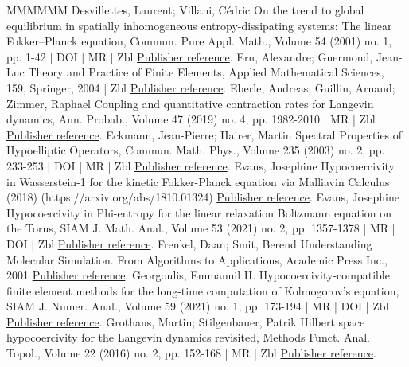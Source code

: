 \begin{thebibliography}{MMMMMM}
 Desvillettes, Laurent; Villani, Cédric On the trend to global equilibrium in spatially inhomogeneous entropy-dissipating systems: The linear Fokker–Planck equation, Commun. Pure Appl. Math., Volume 54 (2001) no. 1, pp. 1-42 | DOI | MR | Zbl \href{https://ahl.centre-mersenne.org/item/AHL_2022__5__523_0/#DV01}{Publisher reference}.
 Ern, Alexandre; Guermond, Jean-Luc Theory and Practice of Finite Elements, Applied Mathematical Sciences, 159, Springer, 2004 | Zbl \href{https://ahl.centre-mersenne.org/item/AHL_2022__5__523_0/#ern2013theory}{Publisher reference}.
 Eberle, Andreas; Guillin, Arnaud; Zimmer, Raphael Coupling and quantitative contraction rates for Langevin dynamics, Ann. Probab., Volume 47 (2019) no. 4, pp. 1982-2010 | MR | Zbl \href{https://ahl.centre-mersenne.org/item/AHL_2022__5__523_0/#EGZ19}{Publisher reference}.
 Eckmann, Jean-Pierre; Hairer, Martin Spectral Properties of Hypoelliptic Operators, Commun. Math. Phys., Volume 235 (2003) no. 2, pp. 233-253 | DOI | MR | Zbl \href{https://ahl.centre-mersenne.org/item/AHL_2022__5__523_0/#EH03}{Publisher reference}.
 Evans, Josephine Hypocoercivity in Wasserstein-1 for the kinetic Fokker-Planck equation via Malliavin Calculus (2018) (https://arxiv.org/abs/1810.01324) \href{https://ahl.centre-mersenne.org/item/AHL_2022__5__523_0/#Ev18}{Publisher reference}.
 Evans, Josephine Hypocoercivity in Phi-entropy for the linear relaxation Boltzmann equation on the Torus, SIAM J. Math. Anal., Volume 53 (2021) no. 2, pp. 1357-1378 | MR | DOI | Zbl \href{https://ahl.centre-mersenne.org/item/AHL_2022__5__523_0/#Ev17}{Publisher reference}.
 Frenkel, Daan; Smit, Berend Understanding Molecular Simulation. From Algorithms to Applications, Academic Press Inc., 2001 \href{https://ahl.centre-mersenne.org/item/AHL_2022__5__523_0/#FrenkelSmit}{Publisher reference}.
 Georgoulis, Emmanuil H. Hypocoercivity-compatible finite element methods for the long-time computation of Kolmogorov’s equation, SIAM J. Numer. Anal., Volume 59 (2021) no. 1, pp. 173-194 | MR | DOI | Zbl \href{https://ahl.centre-mersenne.org/item/AHL_2022__5__523_0/#Georg18}{Publisher reference}.
 Grothaus, Martin; Stilgenbauer, Patrik Hilbert space hypocoercivity for the Langevin dynamics revisited, Methods Funct. Anal. Topol., Volume 22 (2016) no. 2, pp. 152-168 | MR | Zbl \href{https://ahl.centre-mersenne.org/item/AHL_2022__5__523_0/#GS16}{Publisher reference}.

\end{thebibliography}
